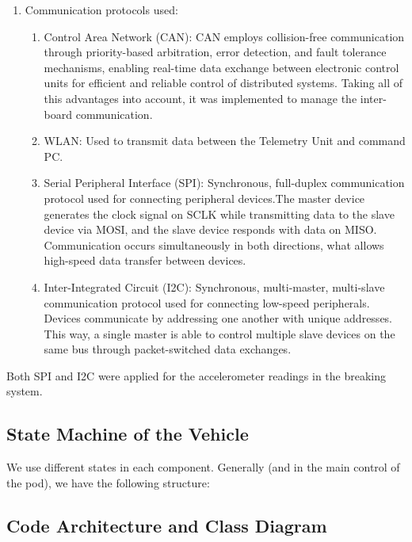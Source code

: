 \begin{enumerate}
    \item Communication protocols used:
\begin{enumerate}
    \item Control Area Network (CAN): CAN employs collision-free communication through priority-based arbitration, error detection, and fault tolerance mechanisms, enabling real-time data exchange between electronic control units for efficient and reliable control of distributed systems. Taking all of this advantages into account, it was implemented to manage the inter-board  communication.

    \item WLAN: Used to transmit data between the Telemetry Unit and command PC.

    \item Serial Peripheral Interface (SPI): Synchronous, full-duplex communication protocol used for connecting peripheral devices.The master device generates the clock signal on SCLK while transmitting data to the slave device via MOSI, and the slave device responds with data on MISO. Communication occurs simultaneously in both directions, what allows high-speed data transfer between devices.

    \item Inter-Integrated Circuit (I2C): Synchronous, multi-master, multi-slave communication protocol used for connecting low-speed peripherals. Devices communicate by addressing one another with unique addresses. This way, a single master is able to control multiple slave devices on the same bus through packet-switched data exchanges. 
\end{enumerate}

\end{enumerate}

Both SPI and I2C were applied for the accelerometer readings in the breaking system.

\subsection{State Machine of the Vehicle}

We use different states in each component. Generally (and in the main control of the pod), we have the following structure:

\subsection{Code Architecture and Class Diagram}

